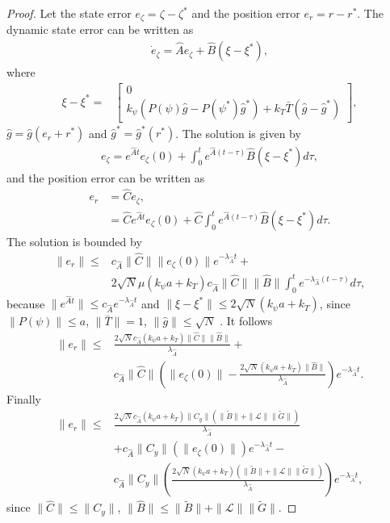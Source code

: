 \begin{proof}
Let the state error $e_{\zeta}=\zeta - \zeta^*$ and the position error $e_r=r-r^*$.
The dynamic state error can be written as
\begin{align}
\dot{e} _{\zeta}=\hat{A}e_{\zeta}+\hat{B}(\xi- \xi^*),
\end{align}
where 
\begin{align*}
\xi- \xi^* = &
\begin{bmatrix}
0 \\
k_{\psi} \left( P(\psi)\hat{g}- P(\psi^*)\hat{g}^*\right) + k_T \bar{T}\left( \hat{g}-\hat{g}^*\right)
\end{bmatrix}, 
\end{align*} 
$\hat{g}=\hat{g}(e_r+r^*)$ and $\hat{g}^*=\hat{g}^*(r^*)$. 
The solution is given by
\begin{align}
e_{\zeta}=e^{\hat{A}t}e_{\zeta}(0)+\int_0^t e^{\hat{A}(t-\tau)}\hat{B}( \xi-\xi^* )d\tau,
\end{align}
and the position error can be written as
\begin{align}
e_r & =\hat{C} e_{\zeta}, \nonumber \\
      & =\hat{C} e^{\hat{A}t}e_{\zeta}(0)+\hat{C}\int_0^t e^{\hat{A}(t-\tau)}\hat{B} ( \xi-\xi^* )d\tau.
\end{align}
The solution is bounded by
\small
\begin{align}
\|e_r\|  \leq  & c_{\hat{A}}\|\hat{C}\| \|e_{\zeta}(0)\| e^{-\lambda_{\hat{A}} t} + \nonumber \\
& 2\sqrt{N}\mu (k_{\psi}a+k_T) c_{\hat{A}} \|\hat{C}\| \|\hat{B}\| \int_0^t e^{-\lambda_{\hat{A}}(t-\tau)}d\tau,
\end{align}
\normalsize
because $\|e^{\hat{A}t}\| \leq c_{\hat{A}}e^{-\lambda_{\hat{A}}t}$ and $\| \xi-\xi^* \| \leq 2\sqrt{N}(k_{\psi}a+k_T)$, since $\|P(\psi)\| \leq a$, $\|\bar{T}\| =1$, $\|\hat{g}\| \leq \sqrt{N}$ . 
It follows
\begin{align}
\|e_r\| \leq & \frac{2\sqrt{N} c_{\hat{A}} (k_{\psi}a+k_T) \|\hat{C}\|\|\hat{B}\|}{\lambda_{\hat{A}}} +\nonumber \\
 & c_{\hat{A}}\|\hat{C}\|\left( \|e_{\zeta}(0)\|- \frac{2\sqrt{N} (k_{\psi}a+k_T)\|\hat{B}\|}{\lambda_{\hat{A}}} \right)e^{-\lambda_{\hat{A}}t}.
\end{align}
Finally
\footnotesize
\begin{align}
\|e_r\| \leq & \frac{2\sqrt{N} c_{\hat{A}} (k_{\psi}a+k_T) \|C_y\| \left(\|\tilde{B}\| + \|\mathcal{L}\|\|\tilde{G}\|\right)}{\lambda_{\hat{A}}} \nonumber\\ 
&+ c_{\hat{A}}\|C_y\|\left( \|e_{\zeta}(0)\| \right)e^{-\lambda_{\hat{A}}t} - \nonumber \\
 & c_{\hat{A}}\|C_y\|\left( \frac{2\sqrt{N} (k_{\psi}a+k_T) \left(\|\tilde{B}\| + \|\mathcal{L}\|\|\tilde{G}\|\right)}{\lambda_{\hat{A}}} \right)e^{-\lambda_{\hat{A}}t},
\end{align}
\normalsize
since $\|\hat{C}\| \leq \|C_y\|$, $\|\hat{B}\| \leq \|\tilde{B}\| + \|\mathcal{L}\|\|\tilde{G}\|$.
\end{proof}


